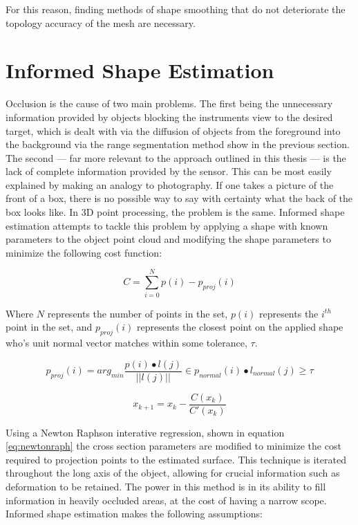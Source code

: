 \documentclass[12pt]{drexelthesis}
\let\Oldsection\section
\renewcommand{\section}{\FloatBarrier\Oldsection}
\begin{document}
For this reason, finding methods of shape smoothing that do not deteriorate the topology accuracy of the mesh are necessary.

\section{Informed Shape Estimation}
\label{subsubsec:informedshape}
Occlusion is the cause of two main problems. The first being the unnecessary information provided by objects blocking the instruments view to the desired target, which is dealt with via the diffusion of objects from the foreground into the background via the range segmentation method show in the previous section. The second --- far more relevant to the approach outlined in this thesis --- is the lack of complete information provided by the sensor. This can be most easily explained by making an analogy to photography. If one takes a picture of the front of a box, there is no possible way to say with certainty what the back of the box looks like. In 3D point processing, the problem is the same. Informed shape estimation attempts to tackle this problem by applying a shape with known parameters to the object point cloud and modifying the shape parameters to minimize the following cost function:

\begin{equation}
	C = \sum_{i=0}^{N}{p(i) - p_{proj}(i)}
\end{equation}

Where $N$ represents the number of points in the set, $p(i)$ represents the $i^{th}$ point in the set, and $p_{proj}(i)$ represents the closest point on the applied shape who's unit normal vector matches within some tolerance, $\tau$.

\begin{equation}
	p_{proj}(i) = arg_{min} \frac{p(i) \bullet l(j)}{||l(j)||} \in p_{normal}(i) \bullet l_{normal}(j) \geq \tau
\end{equation}

\begin{equation}
	\label{eq:newtonraph}
	x_{k+1} = x_{k} - \frac{C(x_{k})}{C'(x_{k})}
\end{equation}

Using a Newton Raphson interative regression, shown in equation \ref{eq:newtonraph} the cross section parameters are modified to minimize the cost required to projection points to the estimated surface. This technique is iterated throughout the long axis of the object, allowing for crucial information such as deformation to be retained. The power in this method is in its ability to fill information in heavily occluded areas, at the cost of having a narrow scope. Informed shape estimation makes the following assumptions:
\end{document}
